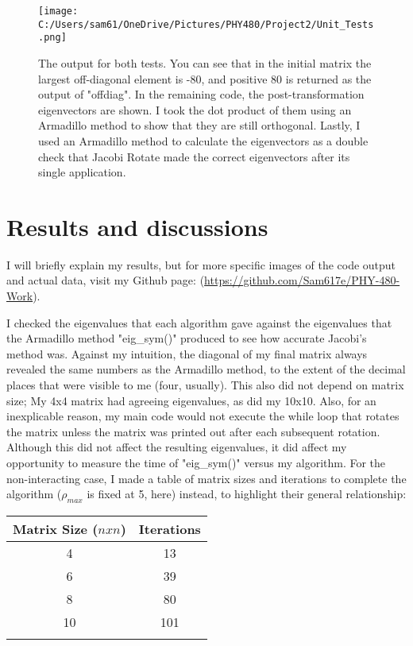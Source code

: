 \documentclass[10pt,showpacs,preprintnumbers,footinbib,amsmath,amssymb,aps,prl,twocolumn,groupedaddress,superscriptaddress,showkeys]{revtex4-1}
\begin{document}
\begin{figure}[!ht]
	\centering
	\texttt{[image: C:/Users/sam61/OneDrive/Pictures/PHY480/Project2/Unit\_Tests.png]}
	\label{uvx}
	\caption{The output for both tests. You can see that in the initial matrix the largest off-diagonal element is -80, and positive 80 is returned as the output of "offdiag". In the remaining code, the post-transformation eigenvectors are shown. I took the dot product of them using an Armadillo method to show that they are still orthogonal. Lastly, I used an Armadillo method to calculate the eigenvectors as a double check that Jacobi Rotate made the correct eigenvectors after its single application.}
\end{figure}


\section{Results and discussions}
I will briefly explain my results, but for more specific images of the code output and actual data, visit my Github page: (\url{https://github.com/Sam617e/PHY-480-Work}).

I checked the eigenvalues that each algorithm gave against the eigenvalues that the Armadillo method "eig\_sym()" produced to see how accurate Jacobi's method was. Against my intuition, the diagonal of my final matrix always revealed the same numbers as the Armadillo method, to the extent of the decimal places that were visible to me (four, usually). This also did not depend on matrix size; My 4x4 matrix had agreeing eigenvalues, as did my 10x10. Also, for an inexplicable reason, my main code would not execute the while loop that rotates the matrix unless the matrix was printed out after each subsequent rotation. Although this did not affect the resulting eigenvalues, it did affect my opportunity to measure the time of "eig\_sym()" versus my algorithm. For the non-interacting case, I made a table of matrix sizes and iterations to complete the algorithm (${\rho_{max}}$ is fixed at 5, here) instead, to highlight their general relationship:

\begin{center}
	\begin{tabular}{cc}
		\hline \hline
			Matrix Size ($n x n$) &  Iterations\\
			\hline
			4 & 13\\
			6 & 39\\
			8 & 80\\
			10 & 101\\
			\hline
			\label{IterationTable}
	\end{tabular}
\end{center}
	
\end{document}
